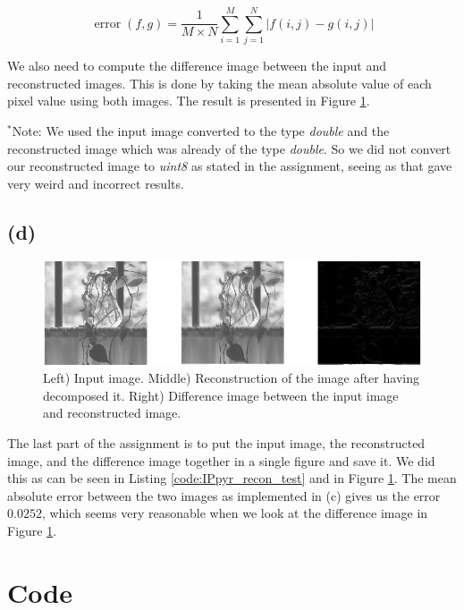 \documentclass{article}
\begin{document}
\begin{equation}\label{eq:meanabserror}
    \operatorname{error}(f, g)=\frac{1}{M \times N} \sum_{i=1}^{M} \sum_{j=1}^{N}|f(i, j)-g(i, j)|
\end{equation}

We also need to compute the difference image between the input and reconstructed images. This is done by taking the mean absolute value of each pixel value using both images. The result is presented in Figure \ref{fig:recon_all}.

$^*$Note: We used the input image converted to the type \textit{double} and the reconstructed image which was already of the type \textit{double}. So we did not convert our reconstructed image to \textit{uint8} as stated in the assignment, seeing as that gave very weird and incorrect results.

\subsection*{(d)}

\begin{figure}[h]
    \centering
    \includegraphics[width=\textwidth]{Assignment_3/output_plots/IPpyr_recon_test.png}
    \caption{Left) Input image. Middle) Reconstruction of the image after having decomposed it. Right) Difference image between the input image and reconstructed image.}
    \label{fig:recon_all}
\end{figure}
The last part of the assignment is to put the input image, the reconstructed image, and the difference image together in a single figure and save it. We did this as can be seen in  Listing \ref{code:IPpyr_recon_test} and in Figure \ref{fig:recon_all}. The mean absolute error between the two images as implemented in (c) gives us the error $0.0252$, which seems very reasonable when we look at the difference image in Figure \ref{fig:recon_all}.


\typeout{}


\newpage
\appendix
\section{Code}
\end{document}
